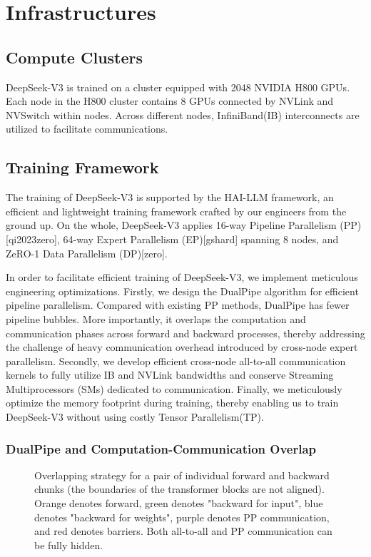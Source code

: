 \documentclass[11pt,a4paper]{article}
\begin{document}
\section{Infrastructures}

\subsection{Compute Clusters}

DeepSeek-V3 is trained on a cluster equipped with 2048 NVIDIA H800 GPUs. Each node in the H800 cluster contains 8 GPUs connected by NVLink and NVSwitch within nodes. Across different nodes, InfiniBand(IB) interconnects are utilized to facilitate communications.

\subsection{Training Framework}

The training of DeepSeek-V3 is supported by the HAI-LLM framework, an efficient and lightweight training framework crafted by our engineers from the ground up. On the whole, DeepSeek-V3 applies 16-way Pipeline Parallelism (PP)[qi2023zero], 64-way Expert Parallelism (EP)[gshard] spanning 8 nodes, and ZeRO-1 Data Parallelism (DP)[zero].

In order to facilitate efficient training of DeepSeek-V3, we implement meticulous engineering optimizations. Firstly, we design the DualPipe algorithm for efficient pipeline parallelism. Compared with existing PP methods, DualPipe has fewer pipeline bubbles. More importantly, it overlaps the computation and communication phases across forward and backward processes, thereby addressing the challenge of heavy communication overhead introduced by cross-node expert parallelism. Secondly, we develop efficient cross-node all-to-all communication kernels to fully utilize IB and NVLink bandwidths and conserve Streaming Multiprocessors (SMs) dedicated to communication. Finally, we meticulously optimize the memory footprint during training, thereby enabling us to train DeepSeek-V3 without using costly Tensor Parallelism(TP).

\subsubsection{DualPipe and Computation-Communication Overlap}

\begin{figure}[h]
\caption{Overlapping strategy for a pair of individual forward and backward chunks (the boundaries of the transformer blocks are not aligned). Orange denotes forward, green denotes "backward for input", blue denotes "backward for weights", purple denotes PP communication, and red denotes barriers. Both all-to-all and PP communication can be fully hidden.}
\end{figure}
\end{document}
